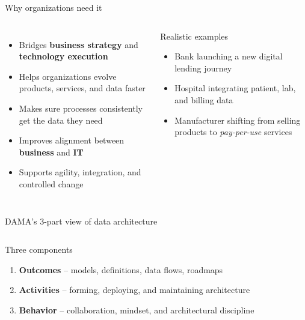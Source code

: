 \documentclass[aspectratio=169,professionalfonts]{beamer}
\newcommand{\sourcefooter}{\vspace{0.4em}{\tiny Source: DAMA-DMBOK2, Chapter 4 (Data Architecture).}}
\begin{document}
\begin{frame}{Why organizations need it}
\begin{columns}[T,totalwidth=\textwidth]
\begin{itemize}
    \item Bridges \textbf{business strategy} and \textbf{technology execution}
    \item Helps organizations evolve products, services, and data faster
    \item Makes sure processes consistently get the data they need
    \item Improves alignment between \textbf{business} and \textbf{IT}
    \item Supports agility, integration, and controlled change
\end{itemize}
\begin{block}{Realistic examples}
\begin{itemize}
    \item Bank launching a new digital lending journey
    \item Hospital integrating patient, lab, and billing data
    \item Manufacturer shifting from selling products to \textit{pay-per-use} services
\end{itemize}
\end{block}
\end{columns}
\sourcefooter
\end{frame}

\begin{frame}{DAMA's 3-part view of data architecture}
\begin{columns}[T,totalwidth=\textwidth]
\begin{block}{Three components}
\begin{enumerate}
    \item \textbf{Outcomes} -- models, definitions, data flows, roadmaps
    \item \textbf{Activities} -- forming, deploying, and maintaining architecture
    \item \textbf{Behavior} -- collaboration, mindset, and architectural discipline
\end{enumerate}
\end{block}
\centering
{}
\end{columns}
\sourcefooter
\end{frame}
\end{document}
